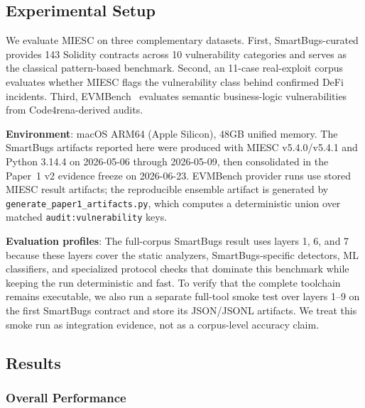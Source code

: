 \documentclass[conference]{IEEEtran}
\begin{document}
\subsection{Experimental Setup}

We evaluate MIESC on three complementary datasets. First, SmartBugs-curated~\cite{durieux2020empirical} provides 143 Solidity contracts across 10 vulnerability categories and serves as the classical pattern-based benchmark. Second, an 11-case real-exploit corpus evaluates whether MIESC flags the vulnerability class behind confirmed DeFi incidents. Third, EVMBench~\cite{evmbench2026} evaluates semantic business-logic vulnerabilities from Code4rena-derived audits.

\textbf{Environment}: macOS ARM64 (Apple Silicon), 48GB unified memory. The SmartBugs artifacts reported here were produced with MIESC v5.4.0/v5.4.1 and Python 3.14.4 on 2026-05-06 through 2026-05-09, then consolidated in the Paper~1 v2 evidence freeze on 2026-06-23. EVMBench provider runs use stored MIESC result artifacts; the reproducible ensemble artifact is generated by \texttt{generate\_paper1\_artifacts.py}, which computes a deterministic union over matched \texttt{audit:vulnerability} keys.

\textbf{Evaluation profiles}: The full-corpus SmartBugs result uses layers 1, 6, and 7 because these layers cover the static analyzers, SmartBugs-specific detectors, ML classifiers, and specialized protocol checks that dominate this benchmark while keeping the run deterministic and fast. To verify that the complete toolchain remains executable, we also run a separate full-tool smoke test over layers 1--9 on the first SmartBugs contract and store its JSON/JSONL artifacts. We treat this smoke run as integration evidence, not as a corpus-level accuracy claim.

\subsection{Results}

\subsubsection{Overall Performance}
\end{document}
